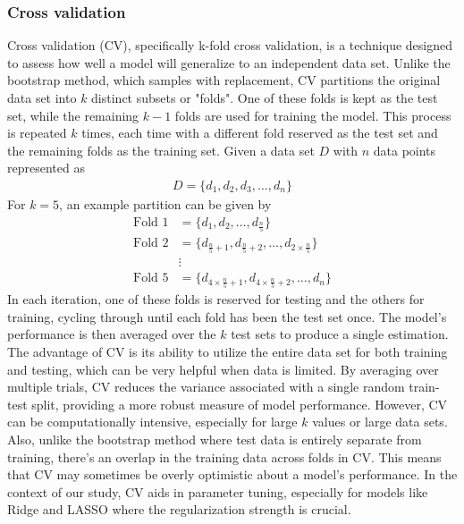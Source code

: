 \subsubsection{Cross validation}
\noindent Cross validation (CV), specifically k-fold cross validation, is a technique designed to assess how well a model will generalize to an independent data set. Unlike the bootstrap method, which samples with replacement, CV partitions the original data set into \(k\) distinct subsets or "folds". One of these folds is kept as the test set, while the remaining \(k-1\) folds are used for training the model. This process is repeated \(k\) times, each time with a different fold reserved as the test set and the remaining folds as the training set. Given a data set \(D\) with \(n\) data points represented as
%
\begin{align}
    D = \{d_1, d_2, d_3, \dots, d_n\}
\end{align}
For \(k=5\), an example partition can be given by
\begin{align*}
    \text{Fold 1} &= \{d_1, d_2, \dots, d_{\frac{n}{5}}\} \\
    \text{Fold 2} &= \{d_{\frac{n}{5}+1}, d_{\frac{n}{5}+2}, \dots, d_{2 \times \frac{n}{5}}\} \\
    &\vdots \\
    \text{Fold 5} &= \{d_{4 \times \frac{n}{5}+1}, d_{4 \times \frac{n}{5}+2}, \dots, d_n\}
\end{align*}
In each iteration, one of these folds is reserved for testing and the others for training, cycling through until each fold has been the test set once. The model's performance is then averaged over the \(k\) test sets to produce a single estimation. The advantage of CV is its ability to utilize the entire data set for both training and testing, which can be very helpful when data is limited. By averaging over multiple trials, CV reduces the variance associated with a single random train-test split, providing a more robust measure of model performance. However, CV can be computationally intensive, especially for large \(k\) values or large data sets. Also, unlike the bootstrap method where test data is entirely separate from training, there's an overlap in the training data across folds in CV. This means that CV may sometimes be overly optimistic about a model's performance.
In the context of our study, CV aids in parameter tuning, especially for models like Ridge and LASSO where the regularization strength is crucial.
